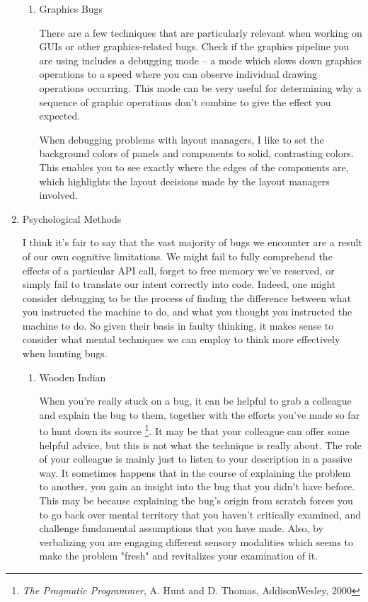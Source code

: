 \documentclass{article}
\begin{document}
\begin{enumerate}
\begin{enumerate}
\item Graphics Bugs
\label{sec:orgheadline321}

There are a few techniques that are particularly relevant when working
on GUIs or other graphics-related bugs. Check if the graphics pipeline
you are using includes a debugging mode -- a mode which slows down
graphics operations to a speed where you can observe individual drawing
operations occurring. This mode can be very useful for determining why a
sequence of graphic operations don't combine to give the effect you
expected.

When debugging problems with layout managers, I like to set the
background colors of panels and components to solid, contrasting colors.
This enables you to see exactly where the edges of the components are,
which highlights the layout decisions made by the layout managers
involved.
\end{enumerate}

\item Psychological Methods
\label{sec:orgheadline329}

I think it's fair to say that the vast majority of bugs we encounter are
a result of our own cognitive limitations. We might fail to fully
comprehend the effects of a particular API call, forget to free memory
we've reserved, or simply fail to translate our intent correctly into
code. Indeed, one might consider debugging to be the process of finding
the difference between what you instructed the machine to do, and what
you thought you instructed the machine to do. So given their basis in
faulty thinking, it makes sense to consider what mental techniques we
can employ to think more effectively when hunting bugs.

\begin{enumerate}
\item Wooden Indian
\label{sec:orgheadline323}

When you're really stuck on a bug, it can be helpful to grab a colleague
and explain the bug to them, together with the efforts you've made so
far to hunt down its source \footnote{\emph{The Pragmatic Programmer}, A. Hunt and D. Thomas, AddisonWesley,
2000}. It may be that your colleague can
offer some helpful advice, but this is not what the technique is really
about. The role of your colleague is mainly just to listen to your
description in a passive way. It sometimes happens that in the course of
explaining the problem to another, you gain an insight into the bug that
you didn't have before. This may be because explaining the bug's origin
from scratch forces you to go back over mental territory that you
haven't critically examined, and challenge fundamental assumptions that
you have made. Also, by verbalizing you are engaging different sensory
modalities which seems to make the problem "fresh" and revitalizes your
examination of it.


\end{enumerate}
\end{enumerate}
\end{document}

